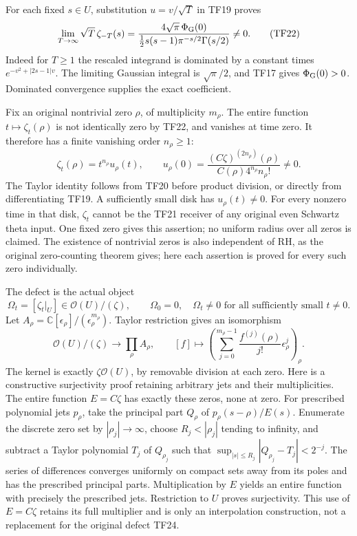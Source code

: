 \documentclass[
  10pt,
  a4paper,
]{article}
\begin{document}
For each fixed \(s\in U\), substitution \(u=v/\sqrt T\) in TF19 proves
\[
\lim_{T\to\infty}\sqrt T\,\zeta_{-T}(s)
=\frac{4\sqrt\pi\,\Phi_{\rm G}(0)}
{\frac12s(s-1)\pi^{-s/2}\Gamma(s/2)}\ne0.
\tag{TF22}
\] Indeed for \(T\ge1\) the rescaled integrand is dominated by a
constant times \(e^{-v^2+|2s-1|v}\). The limiting Gaussian integral is
\(\sqrt\pi/2\), and TF17 gives \(\Phi_{\rm G}(0)>0\). Dominated
convergence supplies the exact coefficient.

Fix an original nontrivial zero \(\rho\), of multiplicity \(m_\rho\).
The entire function \(t\mapsto\zeta_t(\rho)\) is not identically zero by
TF22, and vanishes at time zero. It therefore has a finite vanishing
order \(n_\rho\ge1\): \[
\zeta_t(\rho)=t^{n_\rho}u_\rho(t),\qquad
u_\rho(0)=
\frac{(C\zeta)^{(2n_\rho)}(\rho)}
{C(\rho)4^{n_\rho}n_\rho!}\ne0.
\tag{TF23}
\] The Taylor identity follows from TF20 before product division, or
directly from differentiating TF19. A sufficiently small disk has
\(u_\rho(t)\ne0\). For every nonzero time in that disk, \(\zeta_t\)
cannot be the TF21 receiver of any original even Schwartz theta input.
One fixed zero gives this assertion; no uniform radius over all zeros is
claimed. The existence of nontrivial zeros is also independent of RH, as
the original zero-counting theorem gives; here each assertion is proved
for every such zero individually.

The defect is the actual object \[
\Omega_t=[\zeta_t|_U]\in\mathcal O(U)/(\zeta),\qquad
\Omega_0=0,\quad\Omega_t\ne0\text{ for all sufficiently small }t\ne0.
\tag{TF24}
\] Let \(A_\rho=\mathbb C[\epsilon_\rho]/(\epsilon_\rho^{m_\rho})\).
Taylor restriction gives an isomorphism \[
\mathcal O(U)/(\zeta)\longrightarrow
\prod_\rho A_\rho,\qquad
[f]\longmapsto\left(
\sum_{j=0}^{m_\rho-1}\frac{f^{(j)}(\rho)}{j!}\epsilon_\rho^j
\right)_\rho.
\tag{TF25}
\] The kernel is exactly \(\zeta\mathcal O(U)\), by removable division
at each zero. Here is a constructive surjectivity proof retaining
arbitrary jets and their multiplicities. The entire function
\(E=C\zeta\) has exactly these zeros, none at zero. For prescribed
polynomial jets \(p_\rho\), take the principal part \(Q_\rho\) of
\(p_\rho(s-\rho)/E(s)\). Enumerate the discrete zero set by
\(|\rho_j|\to\infty\), choose \(R_j<|\rho_j|\) tending to infinity, and
subtract a Taylor polynomial \(T_j\) of \(Q_{\rho_j}\) such that
\(\sup_{|s|\le R_j}|Q_{\rho_j}-T_j|<2^{-j}\). The series of differences
converges uniformly on compact sets away from its poles and has the
prescribed principal parts. Multiplication by \(E\) yields an entire
function with precisely the prescribed jets. Restriction to \(U\) proves
surjectivity. This use of \(E=C\zeta\) retains its full multiplier and
is only an interpolation construction, not a replacement for the
original defect TF24.
\end{document}
